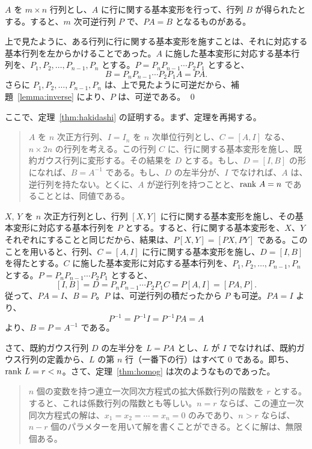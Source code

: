 \begin{lemma} \label{lemma:elemP}
$A$ を $m\times n$ 行列とし、$A$ に行に関する基本変形を行って、行列 $B$ が得られたとする。すると、$m$ 次可逆行列 $P$ で、$PA = B$ となるものがある。
\end{lemma}
\proof
上で見たように、ある行列に行に関する基本変形を施すことは、それに対応する基本行列を左からかけることであった。$A$ に施した基本変形に対応する基本行列を、$P_1, P_2, \ldots, P_{n-1}, P_n$ とする。$P = P_nP_{n-1}\cdots P_2P_1$ とすると、
$$B = P_nP_{n-1}\cdots P_2P_1A = PA.$$
さらに $P_1, P_2, \ldots, P_{n-1}, P_n$ は、上で見たように可逆だから、補題~\ref{lemma:inverse} により、$P$ は、可逆である。
\qed

\medskip
ここで、定理~\ref{thm:hakidashi} の証明する。まず、定理を再掲する。

\begin{quote}
$A$ を $n$ 次正方行列、$I = I_n$ を $n$ 次単位行列とし、$C = [A, I]$ なる、$n\times 2n$ の行列を考える。この行列 $C$ に、行に関する基本変形を施し、既約ガウス行列に変形する。その結果を  $D$ とする。もし、$D = [I, B]$ の形になれば、$B = A^{-1}$ である。もし、$D$ の左半分が、$I$ でなければ、$A$ は、逆行列を持たない。とくに、$A$ が逆行列を持つことと、$\mbox{{\rm rank }} A = n$ であることとは、同値である。
\end{quote}

$X$, $Y$ を $n$ 次正方行列とし、行列 $[X, Y]$ に行に関する基本変形を施し、その基本変形に対応する基本行列を $P$ とする。すると、行に関する基本変形を、$X$、$Y$ それぞれにすることと同じだから、結果は、$P[X, Y] = [PX, PY]$ である。このことを用いると、行列、$C = [A, I]$ に行に関する基本変形を施し、$D = [I, B]$  を得たとする。$C$ に施した基本変形に対応する基本行列を、$P_1, P_2, \ldots, P_{n-1}, P_n$ とする。$P = P_nP_{n-1}\cdots P_2P_1$ とすると、
$$[I, B] = D = P_nP_{n-1}\cdots P_2P_1C = P[A, I] = [PA, P].$$
従って、$PA = I$、$B = P$。$P$ は、可逆行列の積だったから $P$ も可逆。$PA = I$ より、
$$P^{-1} = P^{-1}I = P^{-1}PA = A$$
より、$B = P = A^{-1}$ である。

さて、既約ガウス行列 $D$ の左半分を $L = PA$ とし、$L$ が $I$ でなければ、既約ガウス行列の定義から、$L$ の第 $n$ 行（一番下の行）はすべて $0$ である。即ち、$\mbox{{\rm rank }} L = r < n$。さて、定理~\ref{thm:homog} は次のようなものであった。

\begin{quote}
$n$  個の変数を持つ連立一次同次方程式の拡大係数行列の階数を $r$ とする。すると、これは係数行列の階数とも等しい。$n=r$ ならば、この連立一次同次方程式の解は、$x_1 = x_2 = \cdots = x_n = 0$ のみであり、$n>r$ ならば、$n-r$ 個のパラメターを用いて解を書くことができる。とくに解は、無限個ある。
\end{quote}

